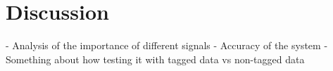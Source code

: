 \chapter{Discussion}

- Analysis of the importance of different signals
- Accuracy of the system 
- Something about how testing it with tagged data vs non-tagged data